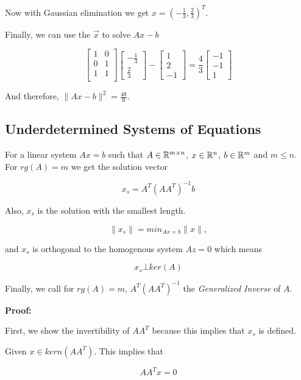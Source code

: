 Now with Gaussian elimination we get \(x = (-\frac{1}{3}, \frac{2}{3})^T\). 

Finally, we can use the \(\vec{x}\) to solve \(Ax - b\)

\[
	\begin{bmatrix}
		1 & 0 \\
		0 & 1 \\
		1 & 1 \\
	\end{bmatrix}
	\begin{bmatrix}
		-\frac{1}{3} \\
		\frac{2}{3}
	\end{bmatrix}
	-
	\begin{bmatrix}
		1 \\
		2 \\
		-1
	\end{bmatrix}
	=
	\frac{4}{3}
	\begin{bmatrix}
	-1 \\
	-1 \\
	1
	\end{bmatrix}
\]

And therefore, \(\|Ax - b\|^2 = \frac{48}{9}\).

\subsection{Underdetermined Systems of Equations}

For a linear system \(Ax = b\) such that \(A \in \mathbb{R}^{m \times n}\), \(x\in \mathbb{R}^n\), 
\(b \in \mathbb{R}^m\) and \(m \le n\). For \(rg(A) = m\) we get the solution vector

\[
	x_s = A^T {(A A^T)}^{-1} b
\]

Also, \(x_s\) is the solution with the smallest length. 

\[
	\|x_s\| = min_{Ax = b} \|x\|,
\] 

and \(x_s\) is orthogonal to the homogenous system \(Az = 0\) which means

\[
	x_s \bot ker(A)
\]

Finally, we call for  \(rg(A) = m\), \(A^T {(A A^T)}^{-1}\) the \emph{Generalized Inverse} of \(A\).

\textbf{Proof:}

First, we show the invertibility of \(AA^T\) because this implies that \(x_s\) is defined.

Given \(x \in kern(AA^T)\). This implies that 

\[
	AA^T x = 0	
\] 

